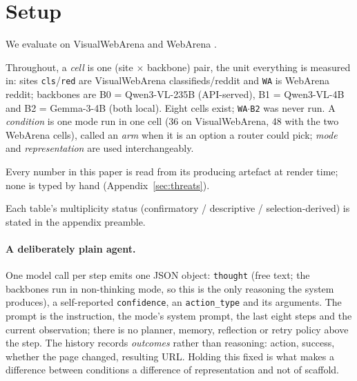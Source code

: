 \section{Setup}\label{sec:setup}

We evaluate on VisualWebArena \citep{koh2024visualwebarena} and WebArena \citep{zhou2024webarena}.

Throughout, a \emph{cell} is one (site $\times$ backbone) pair, the unit everything is measured in: sites \texttt{cls}/\texttt{red} are VisualWebArena classifieds/reddit and \texttt{WA} is WebArena reddit; backbones are B0 = Qwen3-VL-235B (API-served), B1 = Qwen3-VL-4B and B2 = Gemma-3-4B (both local). Eight cells exist; \texttt{WA$\cdot$B2} was never run. A \emph{condition} is one mode run in one cell (36 on VisualWebArena, 48 with the two WebArena cells), called an \emph{arm} when it is an option a router could pick; \emph{mode} and \emph{representation} are used interchangeably.

Every number in this paper is read from its producing artefact at render time; none is typed by hand (Appendix~\ref{sec:threats}).

Each table's multiplicity status (confirmatory / descriptive / selection-derived) is stated in the appendix preamble.

\paragraph{A deliberately plain agent.} One model call per step emits one JSON object: \texttt{thought} (free text; the backbones run in non-thinking mode, so this is the only reasoning the system produces), a self-reported \texttt{confidence}, an \texttt{action\_type} and its arguments. The prompt is the instruction, the mode's system prompt, the last eight steps and the current observation; there is no planner, memory, reflection or retry policy above the step. The history records \emph{outcomes} rather than reasoning: action, success, whether the page changed, resulting URL. Holding this fixed is what makes a difference between conditions a difference of representation and not of scaffold.

